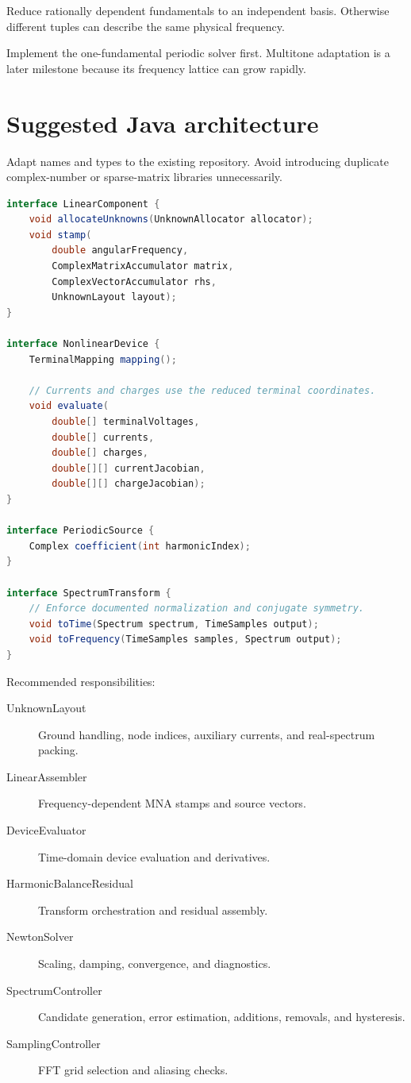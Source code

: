 \documentclass[11pt,a4paper]{article}
\begin{document}
Reduce rationally dependent fundamentals to an independent basis.
Otherwise different tuples can describe the same physical frequency.

Implement the one-fundamental periodic solver first. Multitone
adaptation is a later milestone because its frequency lattice can grow
rapidly.

\section{Suggested Java architecture}

Adapt names and types to the existing repository. Avoid introducing
duplicate complex-number or sparse-matrix libraries unnecessarily.

\begin{lstlisting}[language=Java]
interface LinearComponent {
    void allocateUnknowns(UnknownAllocator allocator);
    void stamp(
        double angularFrequency,
        ComplexMatrixAccumulator matrix,
        ComplexVectorAccumulator rhs,
        UnknownLayout layout);
}

interface NonlinearDevice {
    TerminalMapping mapping();

    // Currents and charges use the reduced terminal coordinates.
    void evaluate(
        double[] terminalVoltages,
        double[] currents,
        double[] charges,
        double[][] currentJacobian,
        double[][] chargeJacobian);
}

interface PeriodicSource {
    Complex coefficient(int harmonicIndex);
}

interface SpectrumTransform {
    // Enforce documented normalization and conjugate symmetry.
    void toTime(Spectrum spectrum, TimeSamples output);
    void toFrequency(TimeSamples samples, Spectrum output);
}
\end{lstlisting}

Recommended responsibilities:
\begin{description}
 \item[UnknownLayout] Ground handling, node indices, auxiliary currents,
       and real-spectrum packing.
 \item[LinearAssembler] Frequency-dependent MNA stamps and source vectors.
 \item[DeviceEvaluator] Time-domain device evaluation and derivatives.
 \item[HarmonicBalanceResidual] Transform orchestration and residual assembly.
 \item[NewtonSolver] Scaling, damping, convergence, and diagnostics.
 \item[SpectrumController] Candidate generation, error estimation,
       additions, removals, and hysteresis.
 \item[SamplingController] FFT grid selection and aliasing checks.
\end{description}
\end{document}
